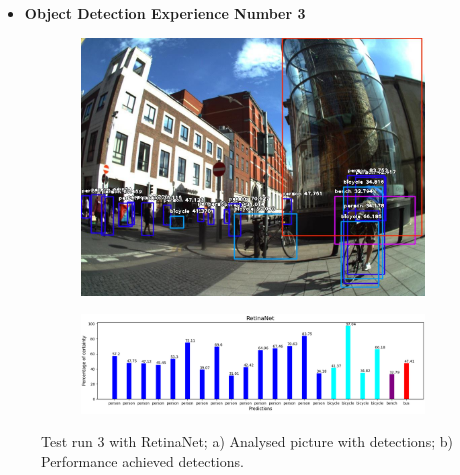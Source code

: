       \newpage

      \begin{itemize}
        \item \textbf{Object Detection Experience Number 3}
      \end{itemize}
    

      \begin{figure}[H]
        \centering
        \captionsetup{justification=centering}

        \begin{subfigure}{0.29\textwidth}
        \includegraphics[width=\textwidth]{Sections/4InitialWork/4_images_obj_run4/retinaNet.jpg} 
        \caption{}
        \end{subfigure}
        \begin{subfigure}{0.7\textwidth}
        \includegraphics[width=\textwidth]{Sections/4InitialWork/4_images_obj_run4/retinaNet_graph.png}
        \caption{}
        \end{subfigure}
        
        \caption[Test run 3 with RetinaNet]{ 
        Test run 3 with RetinaNet; a) Analysed picture with detections; b) Performance achieved detections. }
        \label{fig:retina_3}
        \end{figure}



